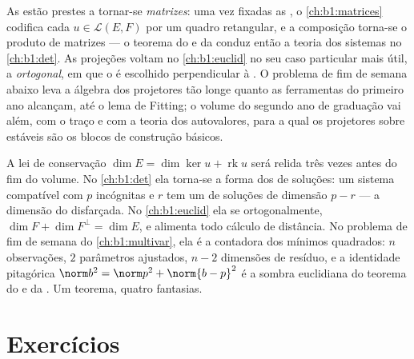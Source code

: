 \begin{remark}
\label{rem:b1:linmaps:whereused}
As  estão prestes a tornar-se \emph{matrizes}:
uma vez fixadas as , o \cref{ch:b1:matrices} codifica cada $u \in \mathcal{L}(E,
F)$ por um quadro
retangular, e a composição torna-se o produto de matrizes --- o
teorema do  e da  conduz então a teoria dos sistemas
 no \cref{ch:b1:det}. As projeções voltam no \cref{ch:b1:euclid} no seu caso
particular mais útil, a  \emph{ortogonal}, em que o 
é escolhido perpendicular à . O problema de fim de semana
abaixo leva a álgebra dos projetores tão longe quanto as
ferramentas do primeiro ano alcançam, até o lema de Fitting; o
volume do segundo ano de graduação vai além, com o traço e com a
teoria dos autovalores, para a qual os projetores sobre 
estáveis são os blocos de construção básicos.
\end{remark}

\begin{remark}
\label{rem:b1:linmaps:perspectives}
A lei de conservação $\dim E = \dim\ker u + \operatorname{rk} u$ será relida três vezes antes do fim do
volume. No \cref{ch:b1:det} ela torna-se a forma dos  de soluções: um
sistema compatível com $p$ incógnitas e  $r$ tem um 
de soluções de dimensão $p - r$ --- a dimensão do 
disfarçada. No \cref{ch:b1:euclid} ela se  ortogonalmente, $\dim F + \dim
F^\perp = \dim E$, e
alimenta todo cálculo de distância. No problema de fim de semana do
\cref{ch:b1:multivar}, ela é a contadora dos mínimos quadrados: $n$ observações,
$2$ parâmetros ajustados, $n - 2$ dimensões de resíduo, e a
identidade pitagórica $\norm b^2 = \norm p^2 + \norm{b - p}^2$ é a sombra euclidiana do teorema do
 e da . Um teorema, quatro fantasias.
\end{remark}

\section{Exercícios}

